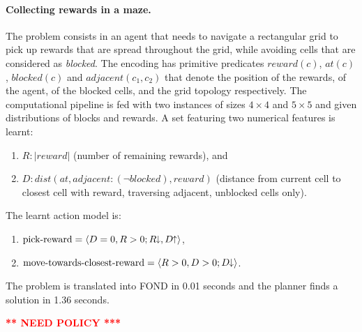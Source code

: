 \documentclass[letterpaper]{article} %
\newcommand{\tup}[1]{\langle #1 \rangle}
\newcommand{\abs}[1]{\ensuremath{\left\vert{#1}\right\vert}}
\newcommand{\abst}[2]{\tup{#1;#2}}
\newcommand{\pplus}{\hspace{-.05em}\raisebox{.15ex}{\footnotesize$\uparrow$}}
\newcommand{\mminus}{\hspace{-.05em}\raisebox{.15ex}{\footnotesize$\downarrow$}}
\begin{document}
% 
% 
% 
% 




\paragraph{Collecting rewards in a maze.}
The problem consists in an agent that needs to navigate a rectangular
grid to pick up rewards that are spread throughout the grid, while 
avoiding cells that are considered as \emph{blocked}.
The encoding has primitive predicates $reward(c)$, $at(c)$, $blocked(c)$
and $adjacent(c_1, c_2)$ that denote the position of the rewards, of
the agent, of the blocked cells, and the grid topology respectively.
The computational pipeline is fed with two instances of sizes $4 \times 4$
and $5\times 5$ and given distributions of blocks and rewards.
A set featuring two numerical features is learnt:
\begin{enumerate}[--]
  \item $R: \abs{reward}$ (number of remaining rewards), and
  \item $D: dist(at, adjacent:(\neg blocked), reward)$ (distance from current
    cell to closest cell with reward, traversing adjacent, unblocked cells only).
\end{enumerate}
The learnt action model is:
\begin{enumerate}[--]
  \item $\text{pick-reward} = \abst{D=0, R > 0}{R\mminus, D\pplus}$,
  \item $\text{move-towards-closest-reward} = \abst{R>0, D>0}{D\mminus}$.
\end{enumerate}

The problem is translated into FOND in 0.01 seconds and the
planner finds a solution in 1.36 seconds.

\textcolor{red}{\bf *** NEED POLICY ***}
\end{document}
